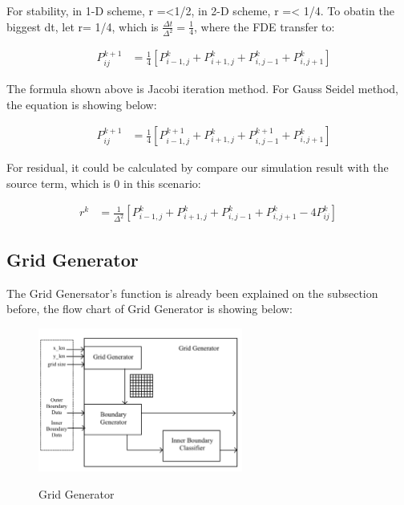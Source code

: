 \documentclass[12pt]{article}
\begin{document}
For stability, in 1-D scheme, r =<1/2, in 2-D scheme, r =< 1/4.
To obatin the biggest dt, let r= 1/4, which is $\frac{\Delta t}{\Delta^2} = \frac{1}{4}$,
where the FDE transfer to:

\begin{align*}
    \quad P_{ij}^{k+1} &= \frac{1}{4} \left[ P_{i-1,j}^k + P_{i+1,j}^k + P_{i,j-1}^k + P_{i,j+1}^k \right]
\end{align*}

The formula shown above is Jacobi iteration method.
For Gauss Seidel method, the equation is showing below:

\begin{align*}
    \quad P_{ij}^{k+1} &= \frac{1}{4} \left[ P_{i-1,j}^{k+1} + P_{i+1,j}^k + P_{i,j-1}^{k+1} + P_{i,j+1}^k \right]
\end{align*}

For residual, it could be calculated by compare our simulation result with
the source term, which is 0 in this scenario:

\begin{align*}
    r^k &= \frac{1}{\Delta^2} \left[ P_{i-1,j}^k + P_{i+1,j}^k + P_{i,j-1}^k + P_{i,j+1}^k - 4P_{ij}^k \right]
\end{align*}





\subsection{Grid Generator}


The Grid Genersator's function is already been explained on the subsection before,
the flow chart of Grid Generator is showing below:


\begin{figure}[H]
    \centering
    \includegraphics[width=0.6\textwidth]{Solver-Bg.jpg}
    \label{Grid Generator.jpg}
    \caption{Grid Generator}
\end{figure}
\end{document}
